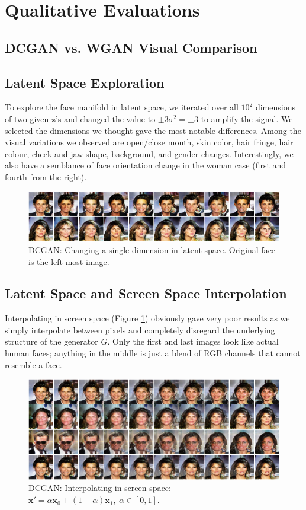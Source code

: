 \documentclass[table]{article}
\def\*#1{\mathbf{#1}}
\begin{document}
\newpage
\section{Qualitative Evaluations}
\subsection{DCGAN vs. WGAN Visual Comparison}


\subsection{Latent Space Exploration}
To explore the face manifold in latent space, we iterated over all $10^2$ dimensions of two given $\*z$'s and changed the value to $\pm 3\sigma^2 = \pm 3$ to amplify the signal. We selected the dimensions we thought gave the most notable differences. Among the visual variations we observed are open/close mouth, skin color, hair fringe, hair colour, cheek and jaw shape, background, and gender changes. Interestingly, we also have a semblance of face orientation change in the woman case (first and fourth from the right).
\begin{figure}[ht]
  \centering
  \includegraphics[width=\textwidth]{imgs/latent_explore}
  \caption{DCGAN: Changing a single dimension in latent space. Original face is the left-most image.}
\end{figure}

\subsection{Latent Space and Screen Space Interpolation}
Interpolating in screen space (Figure \ref{screen_lerp}) obviously gave very poor results as we simply interpolate between pixels and completely disregard the underlying structure of the generator $G$. Only the first and last images look like actual human faces; anything in the middle is just a blend of RGB channels that cannot resemble a face.

\begin{figure}[ht]
  \centering
  \includegraphics[width=\textwidth]{imgs/gan_screen_lerp}
  \caption{DCGAN: Interpolating in screen space: $\*x' = \alpha \*x_0 + (1-\alpha)\*x_1, \ \alpha \in [0,1]$.}
  \label{screen_lerp}
\end{figure}
\end{document}
